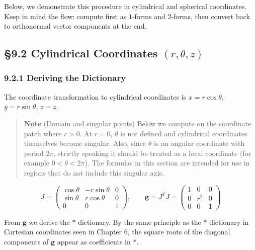 \documentclass[a4paper,12pt,openany]{book}
\begin{document}
Below, we demonstrate this procedure in cylindrical and spherical
coordinates. Keep in mind the flow: compute first as \(1\)-forms and
\(2\)-forms, then convert back to orthonormal vector components at the
end.

\par\vspace{0.35em}\par

\hypertarget{cylindrical-coordinates-rthetaz}{%
\subsection{\texorpdfstring{§9.2 Cylindrical Coordinates
\((r,\theta,z)\)}{§9.2 Cylindrical Coordinates (r,\textbackslash theta,z)}}\label{cylindrical-coordinates-rthetaz}}

\hypertarget{deriving-the-dictionary}{%
\subsubsection{9.2.1 Deriving the
Dictionary}\label{deriving-the-dictionary}}

The coordinate transformation to cylindrical coordinates is
\(x = r\cos\theta\), \(y = r\sin\theta\), \(z = z\).

\begin{quote}
\textbf{Note} (Domain and singular points) Below we compute on the
coordinate patch where \(r > 0\). At \(r = 0\), \(\theta\) is not
defined and cylindrical coordinates themselves become singular. Also,
since \(\theta\) is an angular coordinate with period \(2\pi\), strictly
speaking it should be treated as a local coordinate (for example
\(0 < \theta < 2\pi\)). The formulas in this section are intended for
use in regions that do not include this singular axis.
\end{quote}

\[J = \begin{pmatrix}
\cos\theta & -r\sin\theta & 0 \\
\sin\theta & r\cos\theta & 0 \\
0 & 0 & 1
\end{pmatrix}, \qquad
\mathbf{g} = J^T J = \begin{pmatrix}
1 & 0 & 0 \\
0 & r^2 & 0 \\
0 & 0 & 1
\end{pmatrix}\]

From \(\mathbf{g}\) we derive the \(\ast\) dictionary. By the same
principle as the \(\ast\) dictionary in Cartesian coordinates seen in
Chapter 6, the square roots of the diagonal components of \(\mathbf{g}\)
appear as coefficients in \(\ast\).
\end{document}
